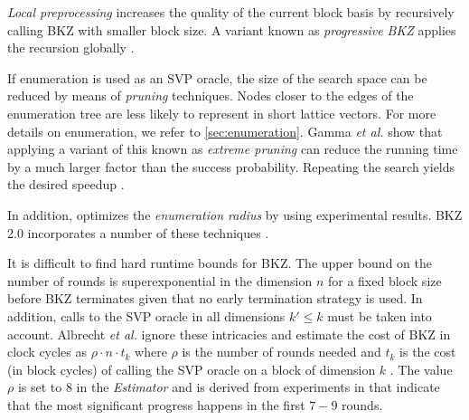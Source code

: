 \textit{Local preprocessing} increases the quality of the current block basis by recursively calling BKZ with smaller block size. A variant known as \textit{progressive BKZ} applies the recursion globally \cite{AWHT16}.

If enumeration is used as an SVP oracle, the size of the search space can be reduced by means of \textit{pruning} techniques. Nodes closer to the edges of the enumeration tree are less likely to represent in short lattice vectors. For more details on enumeration, we refer to \cref{sec:enumeration}. Gamma \textit{et al.} show that applying a variant of this known as \textit{extreme pruning} can reduce the running time by a much larger factor than the success probability. Repeating the search yields the desired speedup \cite{GNR10}.

In addition, \cite{CN11} optimizes the \textit{enumeration radius} by using experimental results. BKZ 2.0 incorporates a number of these techniques \cite{CN11}.


It is difficult to find hard runtime bounds for BKZ. The upper bound on the number of rounds is superexponential in the dimension $n$ for a fixed block size \cite{HPS11a, GN08b} before BKZ terminates given that no early termination strategy is used. In addition, calls to the SVP oracle in all dimensions $k' \leq k$ must be taken into account.
Albrecht \textit{et al.} ignore these intricacies and estimate the cost of BKZ in clock cycles as $\rho \cdot n \cdot t_k$ where $\rho$ is the number of rounds needed and $t_k$ is the cost (in block cycles) of calling the SVP oracle on a block of dimension $k$ \citet{APS15}. The value $\rho$ is set to $8$ in the \textit{Estimator} and is derived from experiments in \cite{Chen13} that indicate that the most significant progress happens in the first $7-9$ rounds. \label{sec:bkz-8d}


